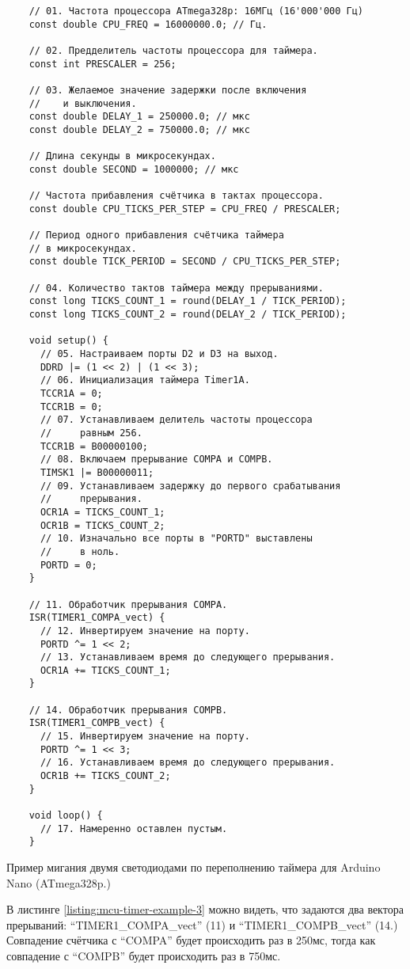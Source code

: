 \documentclass[../sparc.tex]{subfiles}
\begin{document}
\begin{listing}[H]
  \begin{verbatim}
    // 01. Частота процессора ATmega328p: 16МГц (16'000'000 Гц)
    const double CPU_FREQ = 16000000.0; // Гц.

    // 02. Предделитель частоты процессора для таймера.
    const int PRESCALER = 256;

    // 03. Желаемое значение задержки после включения
    //    и выключения.
    const double DELAY_1 = 250000.0; // мкс
    const double DELAY_2 = 750000.0; // мкс

    // Длина секунды в микросекундах.
    const double SECOND = 1000000; // мкс

    // Частота прибавления счётчика в тактах процессора.
    const double CPU_TICKS_PER_STEP = CPU_FREQ / PRESCALER;

    // Период одного прибавления счётчика таймера
    // в микросекундах.
    const double TICK_PERIOD = SECOND / CPU_TICKS_PER_STEP;

    // 04. Количество тактов таймера между прерываниями.
    const long TICKS_COUNT_1 = round(DELAY_1 / TICK_PERIOD);
    const long TICKS_COUNT_2 = round(DELAY_2 / TICK_PERIOD);

    void setup() {
      // 05. Настраиваем порты D2 и D3 на выход.
      DDRD |= (1 << 2) | (1 << 3);
      // 06. Инициализация таймера Timer1A.
      TCCR1A = 0;
      TCCR1B = 0;
      // 07. Устанавливаем делитель частоты процессора
      //     равным 256.
      TCCR1B = B00000100;
      // 08. Включаем прерывание COMPA и COMPB.
      TIMSK1 |= B00000011;
      // 09. Устанавливаем задержку до первого срабатывания
      //     прерывания.
      OCR1A = TICKS_COUNT_1;
      OCR1B = TICKS_COUNT_2;
      // 10. Изначально все порты в "PORTD" выставлены
      //     в ноль.
      PORTD = 0;
    }

    // 11. Обработчик прерывания COMPA.
    ISR(TIMER1_COMPA_vect) {
      // 12. Инвертируем значение на порту.
      PORTD ^= 1 << 2;
      // 13. Устанавливаем время до следующего прерывания.
      OCR1A += TICKS_COUNT_1;
    }

    // 14. Обработчик прерывания COMPB.
    ISR(TIMER1_COMPB_vect) {
      // 15. Инвертируем значение на порту.
      PORTD ^= 1 << 3;
      // 16. Устанавливаем время до следующего прерывания.
      OCR1B += TICKS_COUNT_2;
    }

    void loop() {
      // 17. Намеренно оставлен пустым.
    }
  \end{verbatim}
  \caption{Пример мигания двумя светодиодами по переполнению таймера для Arduino
    Nano (ATmega328p.)}
  \label{listing:mcu-timer-example-3}
\end{listing}

В листинге \ref{listing:mcu-timer-example-3} можно видеть, что задаются два
вектора прерываний: ``TIMER1\_COMPA\_vect'' (11) и ``TIMER1\_COMPB\_vect'' (14.)
Совпадение счётчика с ``COMPA'' будет происходить раз в 250мс, тогда как
совпадение с ``COMPB'' будет происходить раз в 750мс.
\end{document}
